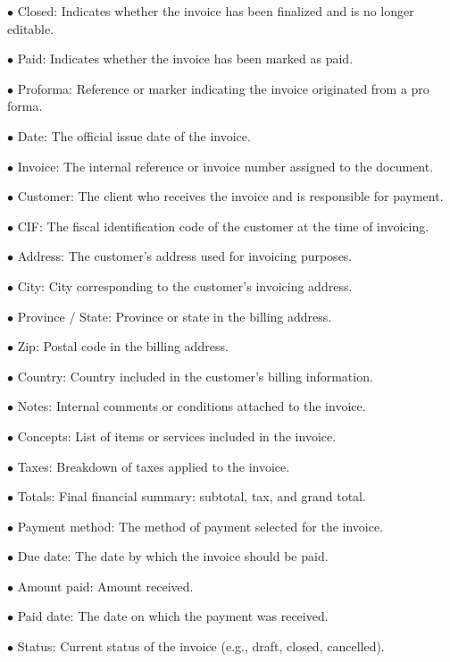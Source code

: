 \documentclass[a4paper]{article}
\begin{document}
\begin{compactitem}
\item[\color{myblue}$\bullet$] Closed: Indicates whether the invoice has been finalized and is no longer editable.
\item[\color{myblue}$\bullet$] Paid: Indicates whether the invoice has been marked as paid.
\item[\color{myblue}$\bullet$] Proforma: Reference or marker indicating the invoice originated from a pro forma.
\item[\color{myblue}$\bullet$] Date: The official issue date of the invoice.
\item[\color{myblue}$\bullet$] Invoice: The internal reference or invoice number assigned to the document.
\item[\color{myblue}$\bullet$] Customer: The client who receives the invoice and is responsible for payment.
\item[\color{myblue}$\bullet$] CIF: The fiscal identification code of the customer at the time of invoicing.
\item[\color{myblue}$\bullet$] Address: The customer's address used for invoicing purposes.
\item[\color{myblue}$\bullet$] City: City corresponding to the customer's invoicing address.
\item[\color{myblue}$\bullet$] Province / State: Province or state in the billing address.
\item[\color{myblue}$\bullet$] Zip: Postal code in the billing address.
\item[\color{myblue}$\bullet$] Country: Country included in the customer's billing information.
\item[\color{myblue}$\bullet$] Notes: Internal comments or conditions attached to the invoice.
\item[\color{myblue}$\bullet$] Concepts: List of items or services included in the invoice.
\item[\color{myblue}$\bullet$] Taxes: Breakdown of taxes applied to the invoice.
\item[\color{myblue}$\bullet$] Totals: Final financial summary: subtotal, tax, and grand total.
\item[\color{myblue}$\bullet$] Payment method: The method of payment selected for the invoice.
\item[\color{myblue}$\bullet$] Due date: The date by which the invoice should be paid.
\item[\color{myblue}$\bullet$] Amount paid: Amount received.
\item[\color{myblue}$\bullet$] Paid date: The date on which the payment was received.
\item[\color{myblue}$\bullet$] Status: Current status of the invoice (e.g., draft, closed, cancelled).
\end{compactitem}
\end{document}
